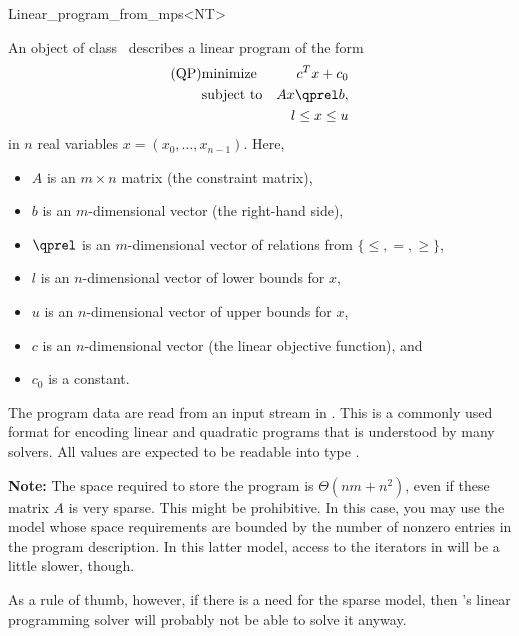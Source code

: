 \begin{ccRefClass}{Linear_program_from_mps<NT>}


\ccDefinition
An object of class \ccRefName\ describes a linear program of the form
\begin{eqnarray*}
\mbox{(QP)}& \mbox{minimize} & c^{T}x+c_0 \\
&\mbox{subject to}   & Ax\qprel b, \\
&                    & l \leq x \leq u
\end{eqnarray*}
in $n$ real variables $x=(x_0,\ldots,x_{n-1})$.
Here, 
\begin{itemize}
\item $A$ is an $m\times n$ matrix (the constraint matrix), 
\item $b$ is an $m$-dimensional vector (the right-hand side),
\item $\qprel$ is an $m$-dimensional vector of relations 
from $\{\leq, =, \geq\}$, 
\item $l$ is an $n$-dimensional vector of lower
bounds for $x$,
\item $u$ is an $n$-dimensional vector of upper bounds for
$x$, 
\item $c$ is an $n$-dimensional vector (the linear objective
  function), and 
\item $c_0$ is a constant.
\end{itemize}

The program data are read from an input stream in . This is
a commonly used format for encoding linear and quadratic programs that
is understood by many solvers. All values are expected to be readable
into type .

\textbf{Note:} The space required to store the program is $\Theta(nm +
n^2)$, even if these matrix $A$ is very sparse. This might be
prohibitive. In this case, you may use the model
 whose space requirements
are bounded by the number of nonzero entries in the program
description. In this latter model, access to the iterators in
 will be a little slower, though.

As a rule of thumb, however, if there is a need for the sparse model,
then \cgal's linear programming solver will probably not be able to 
solve it anyway.

\ccIsModel
{}

\ccCreation
\ccIndexClassCreation
{}


\end{ccRefClass}
